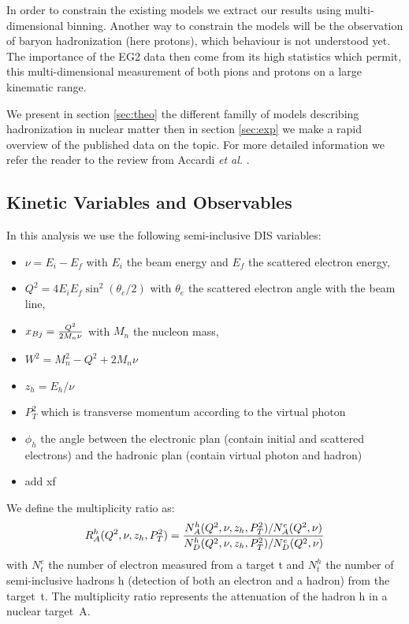 In order to constrain the existing models we extract our results
using multi-dimensional binning. Another way to constrain the models will be
the observation of baryon hadronization (here protons), which behaviour is
not understood yet. 
The importance of the EG2 data then come from its high statistics which permit, 
this multi-dimensional measurement of both pions and protons on a 
large kinematic range.

We present in section \ref{sec:theo} the different familly of models describing
hadronization in nuclear matter then in section \ref{sec:exp} we make a rapid
overview of the published data on the topic. For more detailed information we 
refer the reader to the review from Accardi {\it et al.} \cite{Accardi:2009qv}.


\subsection{Kinetic Variables and Observables}

In this analysis we use the following semi-inclusive DIS variables:
\begin{itemize}
 \item $\nu = E_i - E_f$ with $E_i$ the beam energy and $E_f$ the scattered electron energy,
 \item $Q^2 = 4 E_i E_f \sin ^2(\theta_e / 2)$ with $\theta_e$ the scattered electron angle with the beam line,
 \item $x_{Bj} = {{Q^2} \over {2 M_n \nu}}$ with $M_n$ the nucleon mass,
 \item $W^2 = M_n^2 - Q^2 + 2 M_n \nu$
 \item $z_h = E_h / \nu$
 \item $P_T^2$ which is transverse momentum according to the virtual photon
 \item $\phi_h$ the angle between the electronic plan (contain initial and scattered electrons) and the hadronic plan (contain virtual photon and hadron)
 \item add xf
\end{itemize}

We define the multiplicity ratio as:
\begin{equation}
R_A^h (Q^2,\nu,z_h,P_T^2) = {{N_A^h (Q^2,\nu,z_h,P_T^2) / N_A^e (Q^2,\nu)} 
                       \over {N_D^h (Q^2,\nu,z_h,P_T^2) / N_D^e (Q^2,\nu)}}
\end{equation}
with $N^e_t$ the number of electron measured from a target t and $N_t^h$ the number
of semi-inclusive hadrons h (detection of both an electron and a hadron) from the
target~t. The multiplicity ratio represents the attenuation of the hadron h in a 
nuclear target~A.
\newline

